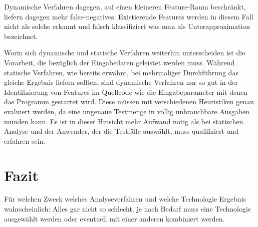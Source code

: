 \documentclass[runningheads,a4paper]{llncs}
\begin{document}
Dynamische Verfahren dagegen, auf einen kleineren Feature-Raum beschränkt, liefern dagegen mehr false-negatives. Existierende Features
werden in diesem Fall nicht als solche erkannt und falsch klassifiziert was man als Unterapproximation bezeichnet.

Worin sich dynamische und statische Verfahren weiterhin unterscheiden ist die Vorarbeit, die bezüglich der Eingabedaten geleistet werden muss. Während statische Verfahren, wie bereits erwähnt, bei mehrmaliger Durchführung das gleiche Ergebnis liefern sollten, sind dynamische Verfahren nur so gut in der Identifizierung von Features im Quellcode wie die Eingabeparameter mit denen das Programm gestartet wird. Diese müssen mit verschiedenen Heuristiken genau evaluiert werden, da eine ungenaue Testmenge in völlig unbrauchbare Ausgaben münden kann. Es ist in dieser Hinsicht mehr Aufwand nötig als bei statischen Analyse und der Anwender, der die Testfälle auswählt, muss qualifiziert und erfahren sein.

\section{Fazit}
Für welchen Zweck welches Analyseverfahren und welche Technologie
Ergebnis wahrscheinlich: Alles gar nicht so schlecht, je nach Bedarf muss eine Technologie ausgewählt werden oder eventuell mit einer anderen kombiniert werden.




\clearpage

\end{document}
